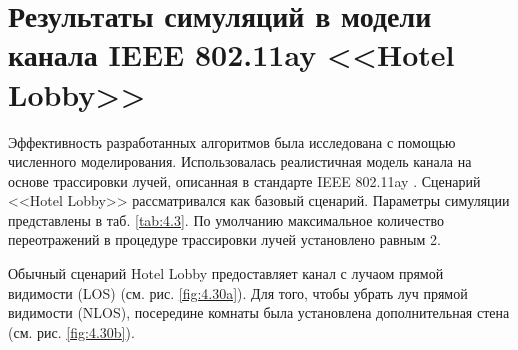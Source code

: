 \section{Результаты симуляций в модели канала IEEE 802.11ay <<Hotel Lobby>>}
\label{sec:simulations}
Эффективность разработанных алгоритмов была исследована с помощью численного
моделирования. Использовалась реалистичная модель канала на основе трассировки
лучей, описанная в стандарте IEEE 802.11ay  \cite{Maltsev2017}. Сценарий
<<Hotel Lobby>> рассматривался как базовый сценарий.
Параметры симуляции представлены в таб. \ref{tab:4.3}.
По умолчанию максимальное количество переотражений в процедуре
трассировки лучей установлено равным 2.

Обычный сценарий Hotel Lobby предоставляет канал с лучаом прямой видимости (LOS)
(см. рис. \ref{fig:4.30a}). Для того, чтобы убрать луч прямой видимости (NLOS),
посередине комнаты была установлена дополнительная стена
(см. рис. \ref{fig:4.30b}).


